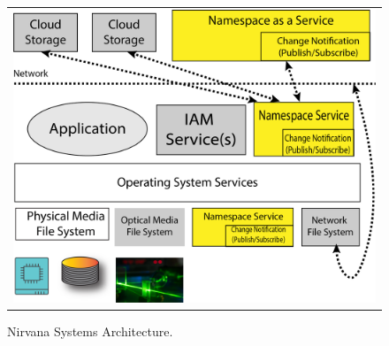 
















\begin{figure}[!tb]
    \centering
    \begin{tabular}{c}
    \includegraphics[width=0.95\columnwidth]{figures/nirvana-arch-8.png}
    \end{tabular}
    \caption{Nirvana Systems Architecture.}  %
    \label{fig:systemsarchitecture}
\end{figure}

